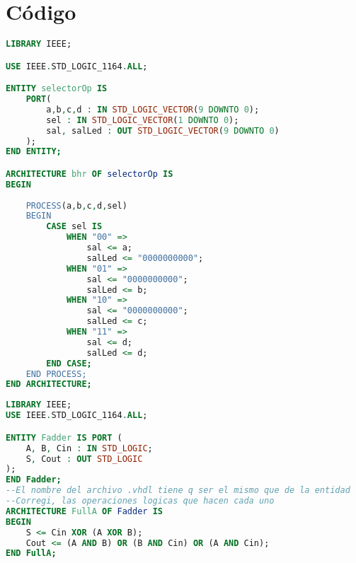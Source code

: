 \section{C\'odigo}
\begin{lstlisting}[language={vhdl}, caption={Selector Operaciones}, label={Script}]
LIBRARY IEEE;

USE IEEE.STD_LOGIC_1164.ALL;

ENTITY selectorOp IS 
	PORT(
		a,b,c,d : IN STD_LOGIC_VECTOR(9 DOWNTO 0);
		sel : IN STD_LOGIC_VECTOR(1 DOWNTO 0);
		sal, salLed : OUT STD_LOGIC_VECTOR(9 DOWNTO 0)
	);
END ENTITY;

ARCHITECTURE bhr OF selectorOp IS
BEGIN
	
	PROCESS(a,b,c,d,sel)
	BEGIN
		CASE sel IS
			WHEN "00" => 
				sal <= a;
				salLed <= "0000000000";
			WHEN "01" => 
				sal <= "0000000000";
				salLed <= b;
			WHEN "10" =>
				sal <= "0000000000";
				salLed <= c;
			WHEN "11" => 
				sal <= d;
				salLed <= d;
		END CASE;
	END PROCESS;
END ARCHITECTURE;
	\end{lstlisting}
\begin{lstlisting}[language={vhdl}, caption={Full adder}, label={Script}]
LIBRARY IEEE;
USE IEEE.STD_LOGIC_1164.ALL;

ENTITY Fadder IS PORT (
    A, B, Cin : IN STD_LOGIC;
    S, Cout : OUT STD_LOGIC
);
END Fadder;
--El nombre del archivo .vhdl tiene q ser el mismo que de la entidad
--Corregi, las operaciones logicas que hacen cada uno
ARCHITECTURE FullA OF Fadder IS
BEGIN
    S <= Cin XOR (A XOR B);
    Cout <= (A AND B) OR (B AND Cin) OR (A AND Cin);
END FullA;
	\end{lstlisting}
